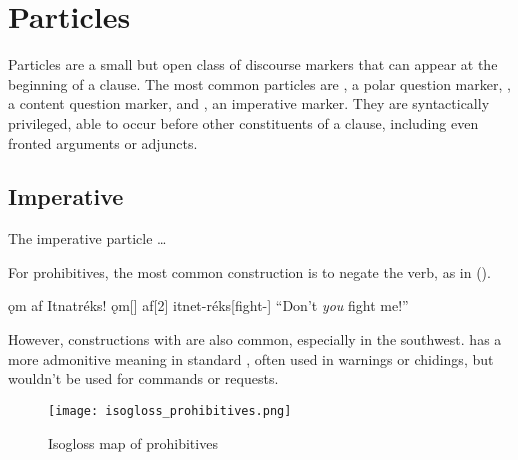 \setchapterpreamble[u]{\margintoc}
\chapter{Particles}
Particles are a small but open class of discourse markers that can appear at the beginning of a clause. The most common particles are , a polar question marker, , a content question marker, and , an imperative marker. They are syntactically privileged, able to occur before other constituents of a clause, including even fronted arguments or adjuncts.

\section{Imperative}
The imperative particle  \dots

For prohibitives, the most common construction is to negate the verb, as in (\nextx).

\begin{gloss}
    \begingl 
        \glpreamble ǫm af Itnatréks! \endpreamble
        ǫm[]
        af[2]
        itnet-réks[fight-]
        \glft “Don't \emph{you} fight me!”
    \endgl
\end{gloss}

However, constructions with  are also common, especially in the southwest.  has a more admonitive meaning in standard \langname{}, often used in warnings or chidings, but wouldn't be used for commands or requests. 

\begin{figure}[h]
    \texttt{[image: isogloss\_prohibitives.png]}
    \caption{Isogloss map of prohibitives}
\end{figure}